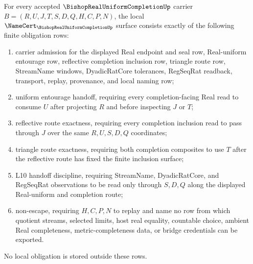 \begin{theorem}
\label{thm:bishop-real-uniform-completion-namecert-obligations}
For every accepted $\BishopRealUniformCompletionUp$ carrier $B=(R,U,J,T,S,D,Q,H,C,P,N)$, the local $\NameCert_{\BishopRealUniformCompletionUp}$ surface consists exactly of the following finite obligation rows:
\begin{enumerate}
\item carrier admission for the displayed Real endpoint and seal row, Real-uniform entourage row, reflective completion inclusion row, triangle route row, StreamName windows, DyadicRatCore tolerances, RegSeqRat readback, transport, replay, provenance, and local naming row;
\item uniform entourage handoff, requiring every completion-facing Real read to consume $U$ after projecting $R$ and before inspecting $J$ or $T$;
\item reflective route exactness, requiring every completion inclusion read to pass through $J$ over the same $R,U,S,D,Q$ coordinates;
\item triangle route exactness, requiring both completion composites to use $T$ after the reflective route has fixed the finite inclusion surface;
\item L10 handoff discipline, requiring StreamName, DyadicRatCore, and RegSeqRat observations to be read only through $S,D,Q$ along the displayed Real-uniform and completion route;
\item non-escape, requiring $H,C,P,N$ to replay and name no row from which quotient streams, selected limits, host real equality, countable choice, ambient Real completeness, metric-completeness data, or bridge credentials can be exported.
\end{enumerate}
No local obligation is stored outside these rows.
\end{theorem}
